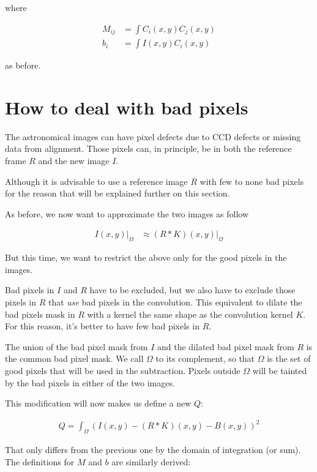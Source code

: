 where

\begin{align}
M_{ij}  &=   \int  C_{i}(x,y)  C_{j}(x,y) \\
b_{i} &=  \int I(x,y) C_{i}(x,y) 
\end{align}

as before.

\section{How to deal with bad pixels} \label{badpixels}

The astronomical images can have pixel defects due to CCD defects or missing data from alignment. 
Those pixels can, in principle, be in both the reference frame $R$ and the new image $I$. 

Although it is advisable to use a reference image $R$ with few to none bad pixels for the reason that will be explained further on this section.

As before, we now want to approximate the two images as follow

\begin{align}
I(x,y)\bigg|_{\Omega} & \approx (R \mathbin{*} K)(x,y)\bigg|_{\Omega}
\end{align}

But this time, we want to restrict the above only for the good pixels in the images.

Bad pixels in $I$ and $R$ have to be excluded, but we also have to exclude those pixels in $R$ that {\em use} bad pixels in the convolution. This equivalent to dilate the bad pixels mask in $R$ with a kernel the same shape as the convolution kernel $K$. For this reason, it's better to have few bad pixels in $R$.

The union of the bad pixel mask from $I$ and the dilated bad pixel mask from $R$ is the common bad pixel mask. We call $\Omega$ to its complement, so that $\Omega$ is the set of good pixels that will be used in the subtraction. Pixels outside $\Omega$ will be tainted by the bad pixels in either of the two images.

This modification will now makes us define a new $Q$:

\begin{align}
Q = \int_{\Omega} \left( I(x,y) - (R \mathbin{*} K)(x,y) - B(x,y) \right)^2
\end{align}

That only differs from the previous one by the domain of integration (or sum).
The definitions for $M$ and $b$ are similarly derived:

